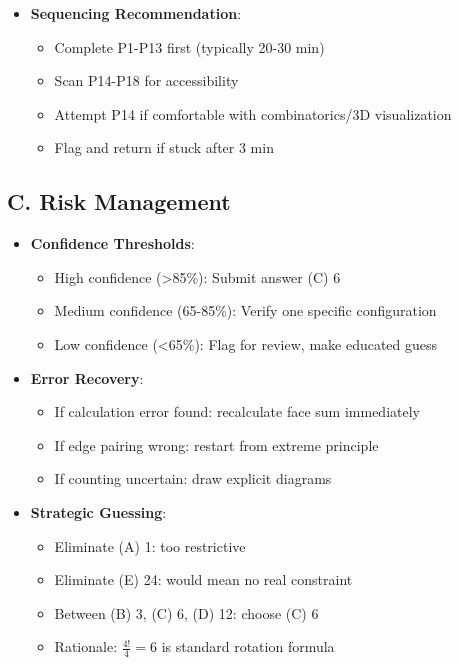 \documentclass[]{article}
\begin{document}
\begin{competitionbox}
\begin{itemize}[leftmargin=*]
    \item \textbf{Sequencing Recommendation}:
    \begin{itemize}
        \item Complete P1-P13 first (typically 20-30 min)
        \item Scan P14-P18 for accessibility
        \item Attempt P14 if comfortable with combinatorics/3D visualization
        \item Flag and return if stuck after 3 min
    \end{itemize}
\end{itemize}

\subsection*{C. Risk Management}
\begin{itemize}[leftmargin=*]
    \item \textbf{Confidence Thresholds}:
    \begin{itemize}
        \item High confidence (>85\%): Submit answer (C) 6
        \item Medium confidence (65-85\%): Verify one specific configuration
        \item Low confidence (<65\%): Flag for review, make educated guess
    \end{itemize}
    
    \item \textbf{Error Recovery}:
    \begin{itemize}
        \item If calculation error found: recalculate face sum immediately
        \item If edge pairing wrong: restart from extreme principle
        \item If counting uncertain: draw explicit diagrams
    \end{itemize}
    
    \item \textbf{Strategic Guessing}:
    \begin{itemize}
        \item Eliminate (A) 1: too restrictive
        \item Eliminate (E) 24: would mean no real constraint
        \item Between (B) 3, (C) 6, (D) 12: choose (C) 6
        \item Rationale: $\frac{4!}{4} = 6$ is standard rotation formula
    \end{itemize}
\end{itemize}


\end{competitionbox}
\end{document}

